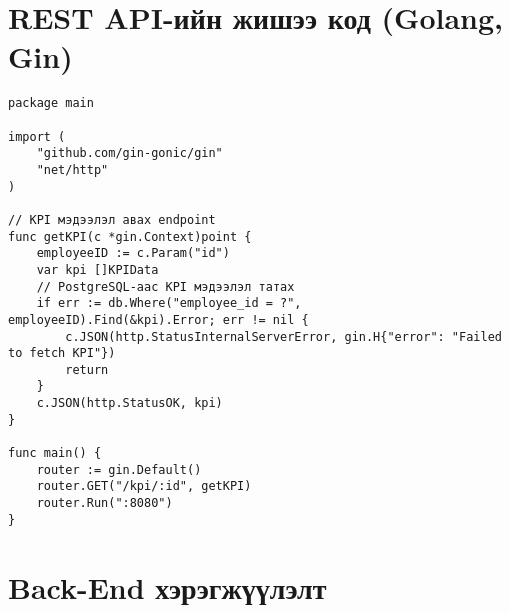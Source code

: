 \appendix
{}



% 

% 

\chapter{REST API-ийн жишээ код (Golang, Gin)}
\label{lst:api}
\begin{lstlisting}[language=Golang, caption=Routes, frame=single]
package main

import (
    "github.com/gin-gonic/gin"
    "net/http"
)

// KPI мэдээлэл авах endpoint
func getKPI(c *gin.Context)point {
    employeeID := c.Param("id")
    var kpi []KPIData
    // PostgreSQL-аас KPI мэдээлэл татах
    if err := db.Where("employee_id = ?", employeeID).Find(&kpi).Error; err != nil {
        c.JSON(http.StatusInternalServerError, gin.H{"error": "Failed to fetch KPI"})
        return
    }
    c.JSON(http.StatusOK, kpi)
}

func main() {
    router := gin.Default()
    router.GET("/kpi/:id", getKPI)
    router.Run(":8080")
}
\end{lstlisting}

\chapter{Back-End хэрэгжүүлэлт}


